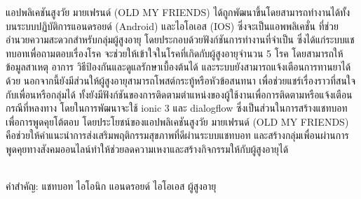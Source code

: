 \begin{thaiabstract}
    แอปพลิเคชันสูงวัย มายเฟรนด์ (OLD MY FRIENDS) ได้ถูกพัฒนาขึ้นโดยสามารถทำงานได้ทั้งบนระบบปฏิบัติการแอนดรอยด์ (Android) และไอโอเอส (IOS) 
    ซึ่งจะเป็นแอพพลิเคชั่น ที่ช่วยอำนวยความสะดวกสำหรับกลุ่มผู้สูงอายุ โดยประกอบด้วยฟังก์ชันการทำงานที่จำเป็น ซึ่งได้แก่ระบบแชทบอทเพื่อถามตอบเรื่องโรค 
    จะช่วยให้เข้าใจในโรคที่เกิดกับผู้สูงอายุจำนวน 5 โรค โดยสามารถให้ข้อมูลสาเหตุ อาการ วิธีป้องกันและดูแลรักษาเบื้องต้นได้ 
    และระบบยังสามารถแจ้งเตือนการทานยาได้ด้วย
    นอกจากนี้ยังมีส่วนให้ผู้สูงอายุสามารถโพสต์กระทู้หรือหัวข้อสนทนา เพื่อช่วยแชร์เรื่องราวที่สนใจกับเพื่อนหรือกลุ่มได้ 
    ทั้งยังมีฟังก์ชันของการติดตามตำแหน่งของผู้ใช้งานเพื่อการติดตามหรือแจ้งเตือนกรณีที่หลงทาง โดยในการพัฒนาจะใช้ ionic 3 
    และ dialogflow ซึ่งเป็นส่วนในการสร้างแชทบอทเพื่อการพูดคุยโต้ตอบ โดยประโยชน์ของแอปพลิเคชันสูงวัย มายเฟรนด์ (OLD MY FRIENDS) 
    คือช่วยให้คำแนะนำการส่งเสริมพฤติกรรมสุขภาพที่ดีผ่านระบบแชทบอท และสร้างกลุ่มเพื่อนผ่านการพูดคุยทางสังคมออนไลน์ทำให้ช่วยลดความเหงาและสร้างกิจกรรมให้กับผู้สูงอายุได้

\noindent
\\คำสำคัญ: แชทบอท ไอโอนิก แอนดรอยด์ ไอโอเอส ผู้สูงอายุ
\end{thaiabstract}
